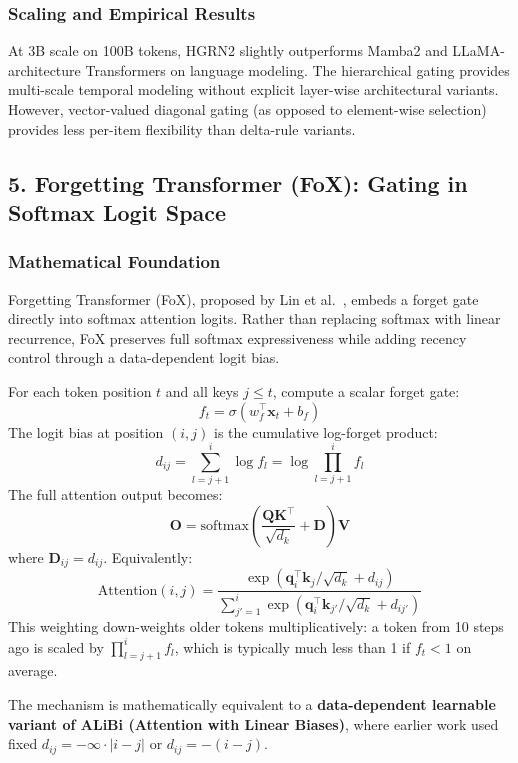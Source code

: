 \subsubsection{Scaling and Empirical Results}

At 3B scale on 100B tokens, HGRN2 slightly outperforms Mamba2 and LLaMA-architecture Transformers on language modeling. The hierarchical gating provides multi-scale temporal modeling without explicit layer-wise architectural variants. However, vector-valued diagonal gating (as opposed to element-wise selection) provides less per-item flexibility than delta-rule variants.

\subsection{5. Forgetting Transformer (FoX): Gating in Softmax Logit Space}

\subsubsection{Mathematical Foundation}

Forgetting Transformer (FoX), proposed by Lin et al.~\citep{lin_forgetting_transformer_2025}, embeds a forget gate directly into softmax attention logits. Rather than replacing softmax with linear recurrence, FoX preserves full softmax expressiveness while adding recency control through a data-dependent logit bias.

For each token position $t$ and all keys $j \le t$, compute a scalar forget gate:
\[
f_t = \sigma(w_f^\top \mathbf{x}_t + b_f)
\]
The logit bias at position $(i,j)$ is the cumulative log-forget product:
\[
d_{ij} = \sum_{l=j+1}^{i} \log f_l = \log \prod_{l=j+1}^{i} f_l
\]
The full attention output becomes:
\[
\mathbf{O} = \text{softmax}\left(\frac{\mathbf{Q}\mathbf{K}^\top}{\sqrt{d_k}} + \mathbf{D}\right) \mathbf{V}
\]
where $\mathbf{D}_{ij} = d_{ij}$. Equivalently:
\[
\text{Attention}(i,j) = \frac{\exp(\mathbf{q}_i^\top \mathbf{k}_j / \sqrt{d_k} + d_{ij})}{\sum_{j'=1}^{i} \exp(\mathbf{q}_i^\top \mathbf{k}_{j'} / \sqrt{d_k} + d_{ij'})}
\]
This weighting down-weights older tokens multiplicatively: a token from 10 steps ago is scaled by $\prod_{l=j+1}^{i} f_l$, which is typically much less than 1 if $f_t < 1$ on average.

The mechanism is mathematically equivalent to a \textbf{data-dependent learnable variant of ALiBi (Attention with Linear Biases)}, where earlier work used fixed $d_{ij} = -\infty \cdot |i-j|$ or $d_{ij} = -(i-j)$.


